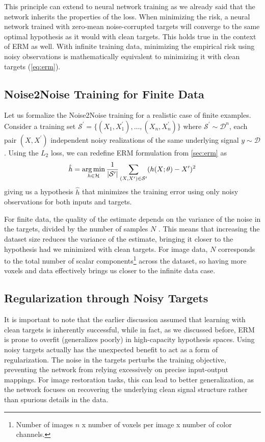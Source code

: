 This principle can extend to neural network training as we already said that the network inherits the properties of the loss. When minimizing the risk, a neural network trained with zero-mean noise-corrupted targets will converge to the same optimal hypothesis as it would with clean targets. This holds true in the context of \gls{ERM} as well. With infinite training data, minimizing the empirical risk using noisy observations is mathematically equivalent to minimizing it with clean targets (\cref{eq:erm}).

\subsection{Noise2Noise Training for Finite Data}
Let us formalize the Noise2Noise training for a realistic case of finite examples. Consider a training set $\mathcal{S}^\prime = \{(X_1, X_1^\prime), \dots, (X_n, X_n^\prime)\}$ where $\mathcal{S}^\prime \sim \mathcal{D}^n$, each pair $(X, X^\prime)$ independent noisy realizations of the same underlying signal $y \sim \mathcal{D}$. Using the $L_2$ loss, we can redefine \gls{ERM} formulation from \cref{sec:erm} as
\begin{equation}\label{eq:erm-noise2noise}
    \hat{h} = \operatorname*{arg\,min}_{h \in \mathcal{H}} \frac{1}{\lvert \mathcal{S^\prime} \rvert} \sum_{(X, X^\prime) \in \mathcal{S}^\prime} (h(X; \theta) - X^\prime)^2
\end{equation}
giving us a hypothesis $\hat{h}$ that minimizes the training error using only noisy observations for both inputs and targets.

For finite data, the quality of the estimate depends on the variance of the noise in the targets, divided by the number of samples $N$ \cite[supplementary~material]{lehtinenNoise2NoiseLearningImage2018}. This means that increasing the dataset size reduces the variance of the estimate, bringing it closer to the hypothesis had we minimized with clean targets. For image data, $N$ corresponds to the total number of scalar components\footnote{Number of images $n$ x number of voxels per image x number of color channels.} across the dataset, so having more voxels and data effectively brings us closer to the infinite data case.

\subsection{Regularization through Noisy Targets}
It is important to note that the earlier discussion assumed that learning with clean targets is inherently successful, while in fact, as we discussed before, \gls{ERM} is prone to overfit (generalizes poorly) in high-capacity hypothesis spaces. Using noisy targets actually has the unexpected benefit to act as a form of regularization. The noise in the targets perturbs the training objective, preventing the network from relying excessively on precise input-output mappings. For image restoration tasks, this can lead to better generalization, as the network focuses on recovering the underlying clean signal structure rather than spurious details in the data.

